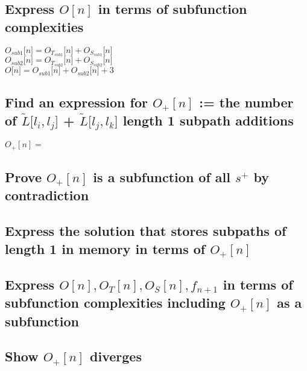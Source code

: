 \documentclass[11pt]{article}
\begin{document}
\subsection{Express $O[n]$ in terms of subfunction complexities}
\begin{center}
$
O_{sub1}\lbrack n \rbrack = O_{T_{sub1}}\lbrack n \rbrack + O_{S_{sub1}}\lbrack n \rbrack
$
\\ \vspace{2mm}
$
O_{sub2}\lbrack n \rbrack = O_{T_{sub2}}\lbrack n \rbrack + O_{S_{sub2}}\lbrack n \rbrack
$
\\ \vspace{2mm}
$
O\lbrack n \rbrack = O_{sub1}\lbrack n \rbrack + O_{sub2}\lbrack n \rbrack + 3
$
\end{center}









\subsection{Find an expression for $O_+[n]$ := the number of $\tilde{L} \lbrack l_i,l_j \rbrack$ + $\tilde{L} \lbrack l_j,l_k \rbrack$  length 1 subpath additions}
\begin{center}
\vspace{2mm}
$
O_+[n] =
$
\end{center}







\subsection{Prove $O_+[n]$ is a subfunction of all $s^+$ by contradiction}
\subsection{Express the solution that stores subpaths of length 1 in memory in terms of $O_+[n]$}
\subsection{Express $O[n],O_T[n],O_S[n],f_{n+1}$ in terms of subfunction complexities including $O_+[n]$ as a subfunction}
\subsection{Show $O_+[n]$ diverges}
\end{document}
